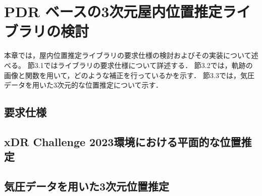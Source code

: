 
\chapter{PDR ベースの3次元屋内位置推定ライブラリの検討}
\thispagestyle{myheadings}
本章では，屋内位置推定ライブラリの要求仕様の検討およびその実装について述べる。
節3.1ではライブラリの要求仕様について詳述する．
節3.2では，軌跡の画像と関数を用いて，どのような補正を行っているかを示す．
節3.3では，気圧データを用いた3次元的な位置推定について示す．


\section{要求仕様}




\section{xDR Challenge 2023環境における平面的な位置推定}








\section{気圧データを用いた3次元位置推定}



